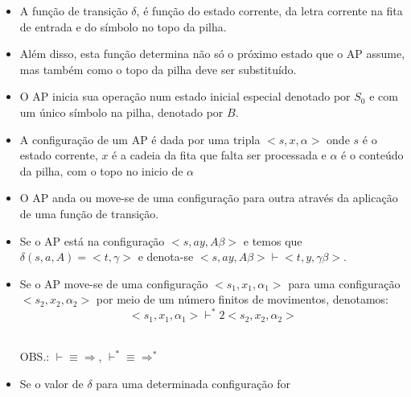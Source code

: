 \documentclass[12pt]{article}
\begin{document}
\begin{itemize}
    por uma cadeia $\alpha \in \Gamma^*$. 
    \begin{itemize}
        \item Se $\alpha = A$, e $A \in \ Gamma$, então o simbolo do topo é 
        substituido por $A$ e a cabeça de leitura escrita continua posicionada 
        no mesmo lugar
        \item Se $\alpha = A_1A_2\ldots A_n, n > 1$ então o simbolo do topo da 
        pilha é retirado, sendo $A_n$, colocado em seu lugar $A_{n-1}$ na posição 
        seguinte, e assim por diante. A cabeça é deslocada para a posição ocupada 
        por $A_1$ que é então o novo topo da pilha
        \item Se $a = \lambda$ então o símbolo do topo da pilha é retirado, 
        fazendo a pilha descrescer
    \end{itemize}
    \item A função de transição $\delta$, é função do estado corrente, da letra 
    corrente na fita de entrada e do símbolo no topo da pilha.
    \item Além disso, esta função determina não só o próximo estado que o AP 
    assume, mas também como o topo da pilha deve ser substituído.
    \item O AP inicia sua operação num estado inicial especial denotado por 
    $S_0$ e com um único símbolo na pilha, denotado por $B$.
    \item A configuração de um AP é dada por uma tripla $<s,x,\alpha>$ onde $s$ 
    é o estado corrente, $x$ é a cadeia da fita que falta ser processada e 
    $\alpha$ é o conteúdo da pilha, com o topo no inicio de $\alpha$
    \item O AP anda ou move-se de uma configuração para outra através da 
    aplicação de uma função de transição.
    \item Se o AP está na configuração $<s, ay, A\beta>$ e temos que 
    $\delta(s,a,A)=<t,\gamma>$ e denota-se $<s,ay,A\beta> \vdash <t,y, \gamma 
    \beta>$.
    \item Se o AP move-se de uma configuração $<s_1, x_1, \alpha_1>$ para uma 
    configuração $<s_2, x_2, \alpha_2>$ por meio de um número finitos de 
    movimentos, denotamos: 
    \[
    <s_1, x_1, \alpha_1> \vdash^* 2<s_2, x_2, \alpha_2>
    \]\\
    \begin{small}
        OBS.: $\vdash \equiv \Rightarrow$, $\vdash^* \equiv \Rightarrow^*$        
    \end{small}
    \item Se o valor de $\delta$ para uma determinada configuração for 

\end{itemize}
\end{document}
